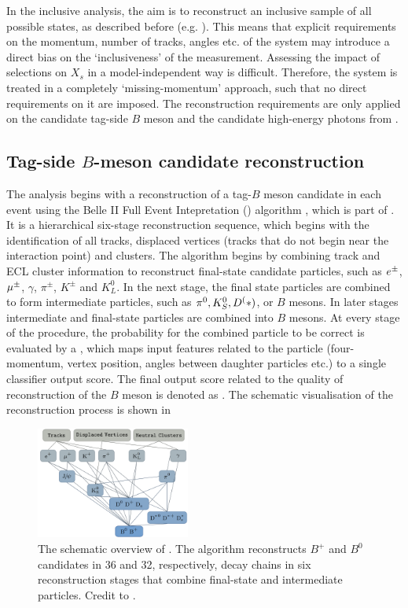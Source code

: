 
In the inclusive \BtoXsgamma analysis, the aim is to reconstruct an inclusive sample of all possible \Xs states, 
as described before (e.g. ).
This means that explicit requirements on the momentum, number of tracks, angles etc. of the \Xs system may introduce a direct bias on the `inclusiveness' of the measurement.
Assessing the impact of selections on $X_s$ in a model-independent way is difficult.
Therefore, the \Xs system is treated in a completely `missing-momentum' approach, such that no direct requirements on it are imposed.
The reconstruction requirements are only applied on the candidate tag-side $B$ meson and the candidate high-energy photons from \BtoXsgamma.
\subsection{Tag-side \texorpdfstring{$B$}{B}-meson candidate reconstruction}\label{sec:tag_reconstruction}

The analysis begins with a reconstruction of a tag-$B$ meson candidate in each event
using the Belle II Full Event Intepretation (\FEI) algorithm \cite{Keck:2017mui,Keck:2018lcd}, which is part of \basftwo.
It is a hierarchical six-stage reconstruction sequence, which begins with the identification of all tracks, displaced vertices (tracks that do not begin near the interaction point) and \ECL clusters.
The algorithm begins by combining track and ECL cluster information to reconstruct final-state candidate particles,
such as $e^\pm$, $\mu^{\pm}$, $\gamma$,  $\pi^{\pm}$, $K^{\pm}$ and $K_L^0$.
In the next stage, the final state particles are combined to form intermediate particles, such as $\pi^0,K_S^0,D^(*)$, or $B$ mesons.
In later stages intermediate and final-state particles are combined into $B$ mesons.
At every stage of the procedure, the probability for the combined particle to be correct is evaluated by a \BDT,
which maps input features related to the particle (four-momentum, vertex position, angles between daughter particles etc.) to a single classifier
output score. The final output score related to the quality of reconstruction of the $B$ meson is denoted as \feiProb. 
The schematic visualisation of the reconstruction process is shown in 
\begin{figure}[htbp!]
    \centering
    \includegraphics[width=0.45\textwidth]{figures/event_reconstruction/FEI_tagging.png}
    \caption{\label{fig:fei_schematic} 
    The schematic overview of \FEI.
    The algorithm reconstructs $B^+$ and $B^0$ candidates in 36 and 32, respectively, decay chains
    in six reconstruction stages that combine final-state and intermediate particles.
    Credit to \cite{Keck:2018lcd}.
    }
\end{figure}

